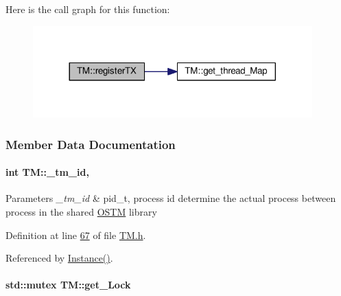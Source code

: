 Here is the call graph for this function\+:
\nopagebreak
\begin{figure}[H]
\begin{center}
\leavevmode
\includegraphics[width=305pt]{class_t_m_a26ea481c24d9aa3aebd6dafb7253376e_a26ea481c24d9aa3aebd6dafb7253376e_cgraph}
\end{center}
\end{figure}




\subsubsection{Member Data Documentation}
\paragraph[{\texorpdfstring{\+\_\+tm\+\_\+id}{_tm_id}}]{\setlength{\rightskip}{0pt plus 5cm}int T\+M\+::\+\_\+tm\+\_\+id\hspace{0.3cm}{\ttfamily [static]}, {\ttfamily [private]}}\hypertarget{class_t_m_a6fb90615393f9205838e302c714bbd60_a6fb90615393f9205838e302c714bbd60}{}\label{class_t_m_a6fb90615393f9205838e302c714bbd60_a6fb90615393f9205838e302c714bbd60}

\begin{DoxyParams}{Parameters}
{\em \+\_\+tm\+\_\+id} & pid\+\_\+t, process id determine the actual process between process in the shared \hyperlink{class_o_s_t_m}{O\+S\+TM} library \\
\hline
\end{DoxyParams}


Definition at line \hyperlink{_t_m_8h_source_l00067}{67} of file \hyperlink{_t_m_8h_source}{T\+M.\+h}.



Referenced by \hyperlink{_t_m_8cpp_source_l00028}{Instance()}.

\paragraph[{\texorpdfstring{get\+\_\+\+Lock}{get_Lock}}]{\setlength{\rightskip}{0pt plus 5cm}std\+::mutex T\+M\+::get\+\_\+\+Lock\hspace{0.3cm}{\ttfamily [private]}}\hypertarget{class_t_m_a123bc5aa0766a7b909bebc54a429e5b0_a123bc5aa0766a7b909bebc54a429e5b0}{}\label{class_t_m_a123bc5aa0766a7b909bebc54a429e5b0_a123bc5aa0766a7b909bebc54a429e5b0}


